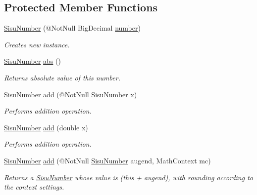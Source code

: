 \subsection*{Protected Member Functions}
\begin{DoxyCompactItemize}
\item 
\hyperlink{classcom_1_1aarrelaakso_1_1drawl_1_1_sisu_number_a023d599bf9d4f001fb88769ecc1a193e}{Sisu\+Number} (@Not\+Null Big\+Decimal \hyperlink{classcom_1_1aarrelaakso_1_1drawl_1_1_sisu_number_a5741c4131458787e3adb0bfe649d7758}{number})
\begin{DoxyCompactList}\small\item\em Creates new instance. \end{DoxyCompactList}\item 
\hyperlink{classcom_1_1aarrelaakso_1_1drawl_1_1_sisu_number}{Sisu\+Number} \hyperlink{classcom_1_1aarrelaakso_1_1drawl_1_1_sisu_number_ab0fbcc012471bbf5dc73166c9e27c66c}{abs} ()
\begin{DoxyCompactList}\small\item\em Returns absolute value of this number. \end{DoxyCompactList}\item 
\hyperlink{classcom_1_1aarrelaakso_1_1drawl_1_1_sisu_number}{Sisu\+Number} \hyperlink{classcom_1_1aarrelaakso_1_1drawl_1_1_sisu_number_a560e7f30c06f119f806f6a4f4a7b709f}{add} (@Not\+Null \hyperlink{classcom_1_1aarrelaakso_1_1drawl_1_1_sisu_number}{Sisu\+Number} x)
\begin{DoxyCompactList}\small\item\em Performs addition operation. \end{DoxyCompactList}\item 
\hyperlink{classcom_1_1aarrelaakso_1_1drawl_1_1_sisu_number}{Sisu\+Number} \hyperlink{classcom_1_1aarrelaakso_1_1drawl_1_1_sisu_number_a427b0e1c60f6dbc58b9fc9f04c3602bb}{add} (double x)
\begin{DoxyCompactList}\small\item\em Performs addition operation. \end{DoxyCompactList}\item 
\hyperlink{classcom_1_1aarrelaakso_1_1drawl_1_1_sisu_number}{Sisu\+Number} \hyperlink{classcom_1_1aarrelaakso_1_1drawl_1_1_sisu_number_a83b45a690cb0d93ca379ee5fccbc5dd1}{add} (@Not\+Null \hyperlink{classcom_1_1aarrelaakso_1_1drawl_1_1_sisu_number}{Sisu\+Number} augend, Math\+Context mc)
\begin{DoxyCompactList}\small\item\em Returns a \hyperlink{classcom_1_1aarrelaakso_1_1drawl_1_1_sisu_number}{Sisu\+Number} whose value is (this + augend), with rounding according to the context settings. \end{DoxyCompactList}\item 

\end{DoxyCompactItemize}
